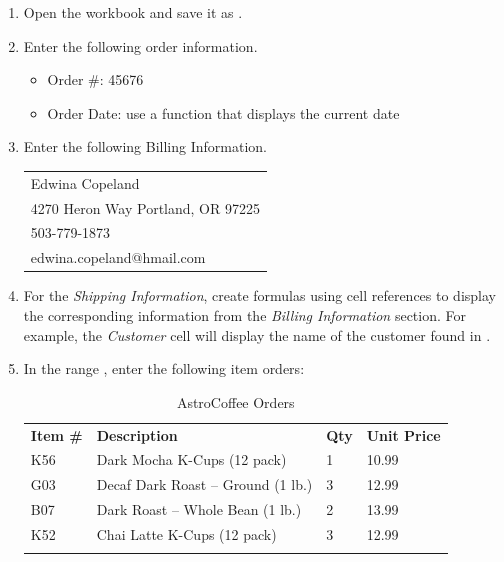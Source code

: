 \begin{enumbox}
	\begin{enumerate}
		\item Open the  workbook and save it as .
		\item Enter the following order information.
	
		\begin{itemize}
			\item Order \#: 45676
			\item Order Date: use a function that displays the current date
		\end{itemize}
	
		\item Enter the following Billing Information.
	
		\begin{tabular}{l}
			\hline
			Edwina Copeland\\
			4270 Heron Way Portland, OR 97225\\
			503-779-1873\\
			edwina.copeland@hmail.com\\
			\hline
		\end{tabular}
		
		\item For the \textit{Shipping Information}, create formulas using cell references to display the corresponding information from the \textit{Billing Information} section. For example, the \textit{Customer} cell will display the name of the customer found in .
		\item In the range , enter the following item orders:
		
		{\small
			\begin{longtable}{p{0.4in}p{2.10in}p{0.25in}p{0.5in}} %
				\textbf{Item \#} & \textbf{Description} & \textbf{Qty} & \textbf{Unit Price}\endhead
				\hline \\
				K56 & Dark Mocha K-Cups (12 pack) & 1 & 10.99\\
				G03 & Decaf Dark Roast – Ground (1 lb.) & 3 & 12.99\\
				B07 & Dark Roast – Whole Bean (1 lb.) & 2 & 13.99\\
				K52 & Chai Latte K-Cups (12 pack) & 3 & 12.99\\
				\caption{AstroCoffee Orders}
				\label{03:tab02}
			\end{longtable}
		}
		

\end{enumerate}
\end{enumbox}
